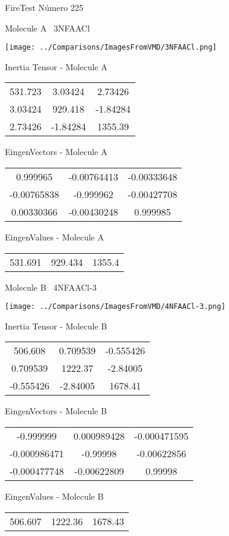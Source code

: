 \vtab[-3cm]
\begin{center}
{\large FireTest \tab Número 225}
\end{center}
\begin{multicols}{2}
\begin{center}

Molecule A \
3NFAACl

\texttt{[image: ../Comparisons/ImagesFromVMD/3NFAACl.png]}

Inertia Tensor - Molecule A \\
\begin{tabular}{|c c c|}
531.723	 & 	3.03424	 & 	2.73426	 \\
3.03424	 & 	929.418	 & 	-1.84284	 \\
2.73426	 & 	-1.84284	 & 	1355.39
\end{tabular}

\vtab
 EingenVectors - Molecule A     \\
\begin{tabular}{|c c c|}
0.999965	 & 	-0.00764413	 & 	-0.00333648	 \\
-0.00765838	 & 	-0.999962	 & 	-0.00427708	 \\
0.00330366	 & 	-0.00430248	 & 	0.999985
\end{tabular}

\vtab
 EingenValues - Molecule A     \\
\begin{tabular}{|c c c|}
531.691	 & 	929.434	 & 	1355.4	 \\
\end{tabular}
\columnbreak

Molecule B \
4NFAACl-3

\texttt{[image: ../Comparisons/ImagesFromVMD/4NFAACl-3.png]}

Inertia Tensor - Molecule B \\
\begin{tabular}{|c c c|}
506.608	 & 	0.709539	 & 	-0.555426	 \\
0.709539	 & 	1222.37	 & 	-2.84005	 \\
-0.555426	 & 	-2.84005	 & 	1678.41
\end{tabular}

\vtab
 EingenVectors - Molecule B     \\
\begin{tabular}{|c c c|}
-0.999999	 & 	0.000989428	 & 	-0.000471595	 \\
-0.000986471	 & 	-0.99998	 & 	-0.00622856	 \\
-0.000477748	 & 	-0.00622809	 & 	0.99998
\end{tabular}

\vtab
 EingenValues - Molecule B     \\
\begin{tabular}{|c c c|}
506.607	 & 	1222.36	 & 	1678.43	 \\
\end{tabular}

\end{center}
\end{multicols}

